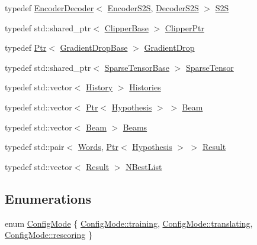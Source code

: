 \begin{DoxyCompactItemize}
\item 
typedef \hyperlink{classmarian_1_1EncoderDecoder}{Encoder\+Decoder}$<$ \hyperlink{classmarian_1_1EncoderS2S}{Encoder\+S2S}, \hyperlink{classmarian_1_1DecoderS2S}{Decoder\+S2S} $>$ \hyperlink{namespacemarian_a83eeb152f60aff415a60e0bde62fcb85}{S2S}
\item 
typedef std\+::shared\+\_\+ptr$<$ \hyperlink{classmarian_1_1ClipperBase}{Clipper\+Base} $>$ \hyperlink{namespacemarian_aae0207a20df3fdd1b9913aa55eafb8b9}{Clipper\+Ptr}
\item 
typedef \hyperlink{namespacemarian_ad1a373be43a00ef9ce35666145137b08}{Ptr}$<$ \hyperlink{classmarian_1_1GradientDropBase}{Gradient\+Drop\+Base} $>$ \hyperlink{namespacemarian_a000da7078105881168a3f17ce1b148bb}{Gradient\+Drop}
\item 
typedef std\+::shared\+\_\+ptr$<$ \hyperlink{classmarian_1_1SparseTensorBase}{Sparse\+Tensor\+Base} $>$ \hyperlink{namespacemarian_a5484064f1fce2661d0b27a5c02a9392b}{Sparse\+Tensor}
\item 
typedef std\+::vector$<$ \hyperlink{classmarian_1_1History}{History} $>$ \hyperlink{namespacemarian_a805aaffc4cae6d189e6a22d2a14cca84}{Histories}
\item 
typedef std\+::vector$<$ \hyperlink{namespacemarian_ad1a373be43a00ef9ce35666145137b08}{Ptr}$<$ \hyperlink{classmarian_1_1Hypothesis}{Hypothesis} $>$ $>$ \hyperlink{namespacemarian_aebdf5ddcd9e7774939696be6e1ceb8f0}{Beam}
\item 
typedef std\+::vector$<$ \hyperlink{namespacemarian_aebdf5ddcd9e7774939696be6e1ceb8f0}{Beam} $>$ \hyperlink{namespacemarian_a441398c850e4cb52313dba352de1a1bc}{Beams}
\item 
typedef std\+::pair$<$ \hyperlink{namespacemarian_a5385eef6e49dd8f789f616ef579dea3f}{Words}, \hyperlink{namespacemarian_ad1a373be43a00ef9ce35666145137b08}{Ptr}$<$ \hyperlink{classmarian_1_1Hypothesis}{Hypothesis} $>$ $>$ \hyperlink{namespacemarian_a39014b8d5e6a286ac891f3da661d6a46}{Result}
\item 
typedef std\+::vector$<$ \hyperlink{namespacemarian_a39014b8d5e6a286ac891f3da661d6a46}{Result} $>$ \hyperlink{namespacemarian_aaae4a49bda201e73a4671babdb7df6b8}{N\+Best\+List}
\end{DoxyCompactItemize}
\subsection*{Enumerations}
\begin{DoxyCompactItemize}
\item 
enum \hyperlink{namespacemarian_aaddd4b008ff5352b1fe7e16574f7e1f9}{Config\+Mode} \{ \hyperlink{namespacemarian_aaddd4b008ff5352b1fe7e16574f7e1f9ac185ddac8b5a8f5aa23c5b80bc12d214}{Config\+Mode\+::training}, 
\hyperlink{namespacemarian_aaddd4b008ff5352b1fe7e16574f7e1f9a5143d2bebfe7a6b9c7050a8f6bf53e2b}{Config\+Mode\+::translating}, 
\hyperlink{namespacemarian_aaddd4b008ff5352b1fe7e16574f7e1f9a6911beb2d5fc11863fef8f5daee5a184}{Config\+Mode\+::rescoring}
 \}
\end{DoxyCompactItemize}
